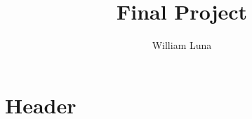 \documentclass[
	letterpaper, %
]{jdf}
\author{William Luna}
\title{Final Project}
\begin{document}

\maketitle
\section{Header}

\printbibliography{}
\end{document}
